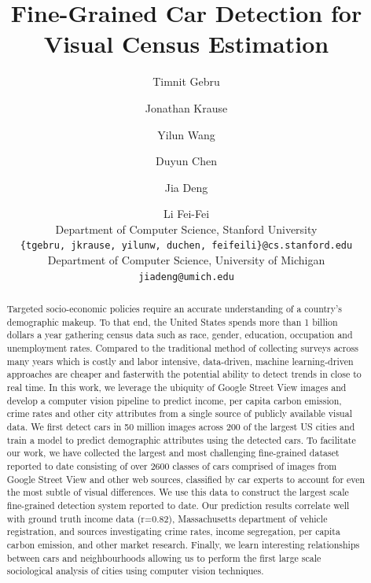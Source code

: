 \documentclass[letterpaper]{article}
\begin{document}
\title{Fine-Grained Car Detection for Visual Census Estimation}
\author{Timnit Gebru \and Jonathan Krause \and Yilun Wang \and Duyun Chen \and Jia Deng \and Li Fei-Fei\\
Department of Computer Science, Stanford University\\
{\texttt {\{tgebru, jkrause, yilunw, duchen, feifeili\}@cs.stanford.edu}}\\
Department of Computer Science, University of Michigan\\
\texttt {jiadeng@umich.edu}
}

\maketitle

\begin{abstract}
Targeted socio-economic policies require an accurate understanding of a country's demographic makeup. To that end, the United States spends more than 1 billion dollars a year gathering census data such as race, gender, education, occupation and unemployment rates. Compared to the traditional method of collecting surveys across many years which is costly and labor intensive, data-driven, machine learning-driven approaches are cheaper and faster\textemdash with the potential ability to detect trends in close to real time. In this work, we leverage the ubiquity of Google Street View images and develop a computer vision pipeline to predict income, per capita carbon emission, crime rates and other city attributes from a single source of publicly available visual data. We first detect cars in 50 million images across 200 of the largest US cities and train a model to predict demographic attributes using the detected cars. To facilitate our work, we have collected the largest and most challenging fine-grained dataset reported to date consisting of over 2600 classes of cars comprised of images from Google Street View and other web sources, classified by car experts to account for even the most subtle of visual differences. We use this data to construct the largest scale fine-grained detection system reported to date. Our prediction results correlate well with ground truth income data (r=0.82), Massachusetts department of vehicle registration, and sources investigating crime rates, income segregation, per capita carbon emission, and other market research. Finally, we learn interesting relationships between cars and neighbourhoods allowing us to perform the first large scale sociological analysis of cities using computer vision techniques.

\end{abstract}
\end{document}

